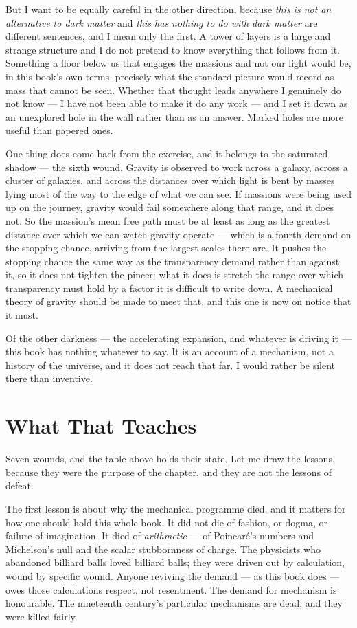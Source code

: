 \documentclass[fontsize=11pt,paper=a4,pagesize=auto,parskip=half-]{scrbook}
\begin{document}
But I want to be equally careful in the other direction, because \emph{this is not an alternative to dark matter} and \emph{this has nothing to do with dark matter} are different sentences, and I mean only the first. A tower of layers is a large and strange structure and I do not pretend to know everything that follows from it. Something a floor below us that engages the massions and not our light would be, in this book's own terms, precisely what the standard picture would record as mass that cannot be seen. Whether that thought leads anywhere I genuinely do not know --- I have not been able to make it do any work --- and I set it down as an unexplored hole in the wall rather than as an answer. Marked holes are more useful than papered ones.

One thing does come back from the exercise, and it belongs to the saturated shadow --- the sixth wound. Gravity is observed to work across a galaxy, across a cluster of galaxies, and across the distances over which light is bent by masses lying most of the way to the edge of what we can see. If massions were being used up on the journey, gravity would fail somewhere along that range, and it does not. So the massion's mean free path must be at least as long as the greatest distance over which we can watch gravity operate --- which is a fourth demand on the stopping chance, arriving from the largest scales there are. It pushes the stopping chance the same way as the transparency demand rather than against it, so it does not tighten the pincer; what it does is stretch the range over which transparency must hold by a factor it is difficult to write down. A mechanical theory of gravity should be made to meet that, and this one is now on notice that it must.

Of the other darkness --- the accelerating expansion, and whatever is driving it --- this book has nothing whatever to say. It is an account of a mechanism, not a history of the universe, and it does not reach that far. I would rather be silent there than inventive.


\section{What That Teaches}

Seven wounds, and the table above holds their state. Let me draw the lessons, because they were the purpose of the chapter, and they are not the lessons of defeat.

The first lesson is about why the mechanical programme died, and it matters for how one should hold this whole book. It did not die of fashion, or dogma, or failure of imagination. It died of \emph{arithmetic} --- of Poincaré's numbers and Michelson's null and the scalar stubbornness of charge. The physicists who abandoned billiard balls loved billiard balls; they were driven out by calculation, wound by specific wound. Anyone reviving the demand --- as this book does --- owes those calculations respect, not resentment. The demand for mechanism is honourable. The nineteenth century's particular mechanisms are dead, and they were killed fairly.
\end{document}
